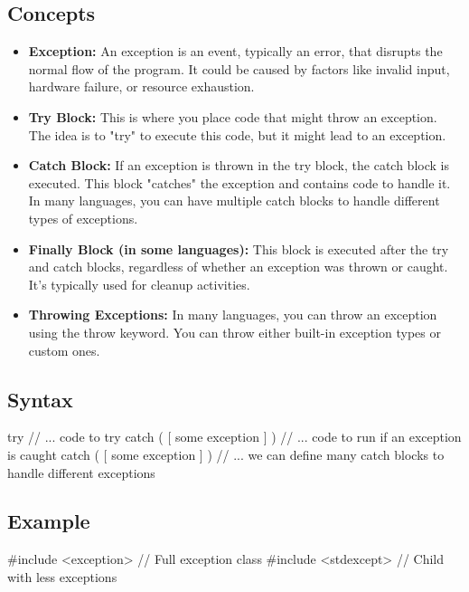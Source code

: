 \documentclass{report}
\begin{document}
\begin{concept}
    \subsection{Concepts}
    \begin{itemize}
        \item \textbf{Exception:} An exception is an event, typically an error, that disrupts the normal flow of the program. It could be caused by factors like invalid input, hardware failure, or resource exhaustion.
        \item \textbf{Try Block:} This is where you place code that might throw an exception. The idea is to "try" to execute this code, but it might lead to an exception.
        \item \textbf{Catch Block:} If an exception is thrown in the try block, the catch block is executed. This block "catches" the exception and contains code to handle it. In many languages, you can have multiple catch blocks to handle different types of exceptions.
        \item \textbf{Finally Block (in some languages):} This block is executed after the try and catch blocks, regardless of whether an exception was thrown or caught. It's typically used for cleanup activities.
        \item \textbf{Throwing Exceptions:} In many languages, you can throw an exception using the throw keyword. You can throw either built-in exception types or custom ones.
    \end{itemize}

    \bigbreak \noindent 
    \subsection{Syntax}
    \bigbreak \noindent 
    \begin{cppcode}
        try {
            // ... code to try
        } catch ( [ some exception ] ) {
            // ... code to run if an exception is caught
        } catch ( [ some exception ] ) {
            // ... we can define many catch blocks to handle different exceptions
        }
    \end{cppcode}

    \pagebreak 
    \subsection{Example}
    \bigbreak \noindent 
    \begin{cppcode}
        #include <exception> // Full exception class
        #include <stdexcept> // Child with less exceptions


\end{cppcode}
\end{concept}
\end{document}
